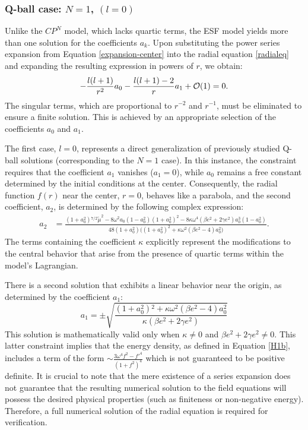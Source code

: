 \documentclass[aps,prd,superscriptaddress,notitlepage,11pt,final,longbibliography,nofootinbib]{revtex4-1}
\numberwithin{equation}{section}
\begin{document}
\subsubsection{Q-ball case: $N=1$, $(l=0)$}
Unlike the  $CP^N$ model, which lacks quartic terms, the ESF model yields more than one solution for the coefficients $a_k$. Upon substituting the power series expansion from Equation \eqref{expansion-center} into the radial equation \eqref{radialeq} and expanding the resulting expression in powers of $r$, we obtain:
\begin{equation}
-\frac{l(l+1)}{r^2}a_0-\frac{l(l+1)-2}{r}a_1+{\cal O}(1)=0.\label{eq:expansion}
\end{equation}
The singular terms, which are proportional to $r^{-2}$ and $r^{-1}$, must be eliminated to ensure a finite solution. This is achieved by an appropriate selection of the coefficients $a_0$ and $a_1$.

The first case, $l=0$, represents a direct generalization of previously studied Q-ball solutions (corresponding to the $N=1$ case). In this instance, the constraint requires that the coefficient $a_1$ vanishes ($a_1=0$), while $a_0$ remains a free constant determined by the initial conditions at the center. Consequently, the radial function $f(r)$ near the center, $r=0$, behaves like a parabola, and the second coefficient, $a_2$, is determined by the following complex expression:
\begin{align}
a_2&=\frac{\left(1+a_0^2\right){}^{7/2} \tilde\mu ^2-8  \omega ^2 a_0
   \left(1-a_0^2\right) \left(1+a_0^2\right)^2-8 \kappa  \omega ^4 \left(\beta  e^2+2 \gamma  e^2\right)a_0^3 \left(1-a_0^2\right) }{48 \left(1+a_0^2\right) \Big((1+a_0^2)^2+\kappa  \omega ^2 \left(\beta 
   e^2-4\right)a_0^2\Big)}.\label{CP1_a2}
\end{align}
The terms containing the coefficient $\kappa$ explicitly represent the modifications to the central behavior that arise from the presence of quartic terms within the model's Lagrangian.

There is a second solution that exhibits a linear behavior near the origin, as determined by the coefficient $a_1$:
\begin{equation}
a_1=\pm\sqrt{\frac{\left(1+a_0^2\right){}^2+\kappa  \omega ^2 \left(\beta  e^2-4\right)a_0^2 }{\kappa  \left(\beta  e^2+2 \gamma  e^2\right)}}\label{CP1_a1}
\end{equation}
This solution is mathematically valid only when $\kappa\neq 0$ and  $\beta  e^2+2 \gamma  e^2\neq 0$. This latter constraint implies that the energy density, as defined in Equation \eqref{H1b}, includes a term of the form $\sim\frac{3\omega^4 f^2-f'^4}{(1+f^2)^4}$ which is not guaranteed to be positive definite. It is crucial to note that the mere existence of a series expansion does not guarantee that the resulting numerical solution to the field equations will possess the desired physical properties (such as finiteness or non-negative energy). Therefore, a full numerical solution of the radial equation is required for verification.
\end{document}
